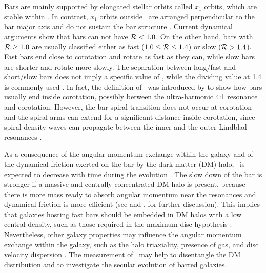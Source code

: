 \documentclass{aa}
\begin{document}
Bars are mainly supported by elongated stellar orbits called $x_1$ orbits, which are stable within \rcor. In contrast, $x_1$ orbits outside \rcor\ are arranged perpendicular to the bar major axis and do not sustain the bar structure \citep{contopoulos1980,Contopoulos1981,Vasiliev2015}. Current dynamical arguments show that bars can not have ${\cal R} < 1.0$. On the other hand, bars with ${\cal R} \geq 1.0$ are usually classified either as fast ($1.0 \leq {\cal R} \leq 1.4$) or slow (${\cal R} > 1.4$). Fast bars end close to corotation and rotate as fast as they can, while slow bars are shorter and rotate more slowly. The separation between long/fast and short/slow bars does not imply a specific value of \omegabar, while the dividing value at 1.4 is commonly used \citep{Athanassoula1992,Debattista2000}. In fact, the definition of \rr\ was introduced by \citet{Elmegreen1996bis} to show how bars usually end inside corotation, possibly between the ultra-harmonic 4:1 resonance and corotation. However, the bar-spiral transition does not occur at corotation and the spiral arms can extend for a significant distance inside corotation, since spiral density waves can propagate between the inner and the outer Lindblad resonances \citep{Adams1989,Bertin1996}.

As a consequence of the angular momentum exchange within the galaxy and of the dynamical friction exerted on the bar by the dark matter (DM) halo, \omegabar\ is expected to decrease with time during the evolution \citep{weinberg1985,little1991,Debattista1998,oneill2003,villavargas2010,Athanassoula2013}. The slow down of the bar is stronger if a massive and centrally-concentrated DM halo is present, because there is more mass ready to absorb angular momentum near the resonances and dynamical friction is more efficient (see \citealt{Athanassoula2014} and \citealt{Sellwood2014}, for further discussion). This implies that galaxies hosting fast bars should be embedded in DM halos with a low central density, such as those required in the maximum disc hypothesis \citep{Debattista2000,Palunas2000,Fuchs2001,Starkman2018}. Nevertheless, other galaxy properties may influence the angular momentum exchange within the galaxy, such as the halo triaxiality, presence of gas, and disc velocity dispersion \citep{Athanassoula2003,Athanassoula2013}. The measurement of \rr\ may help to disentangle the DM distribution and to investigate the secular evolution of barred galaxies.
\end{document}
